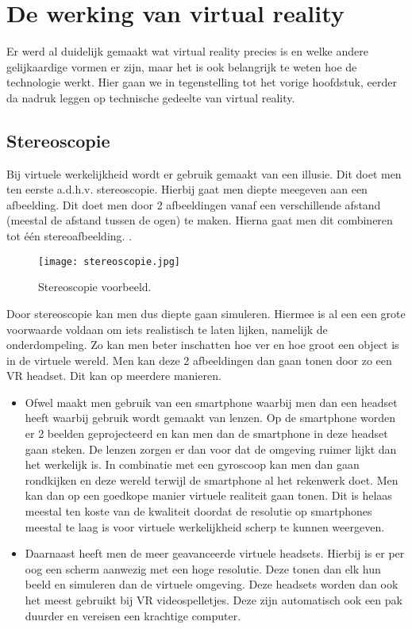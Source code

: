 \section{De werking van virtual reality}
\label{sec:hoe-werkt-vr}
Er werd al duidelijk gemaakt wat virtual reality precies is en welke andere gelijkaardige vormen er zijn, maar het is ook belangrijk te weten hoe de technologie werkt. Hier gaan we in tegenstelling tot het vorige hoofdstuk, eerder da nadruk leggen op technische gedeelte van virtual reality.

\subsection{Stereoscopie}
\label{subsec:stereoscopie}
Bij virtuele werkelijkheid wordt er gebruik gemaakt van een illusie. Dit doet men ten eerste a.d.h.v. stereoscopie. Hierbij gaat men diepte meegeven aan een afbeelding. Dit doet men door 2 afbeeldingen vanaf een verschillende afstand (meestal de afstand tussen de ogen) te maken. Hierna gaat men dit combineren tot één stereoafbeelding. \autocite{Rouse2011}.

\begin{figure}
	\centering
	\texttt{[image: stereoscopie.jpg]}
	\caption{Stereoscopie voorbeeld.}
	\label{fig:stereoscopie}
\end{figure}

Door stereoscopie kan men dus diepte gaan simuleren. Hiermee is al een een grote voorwaarde voldaan om iets realistisch te laten lijken, namelijk de onderdompeling. Zo kan men beter inschatten hoe ver en hoe groot een object is in de virtuele wereld. Men kan deze 2 afbeeldingen dan gaan tonen door zo een VR headset. Dit kan op meerdere manieren.
\begin{itemize}
	\item Ofwel maakt men gebruik van een smartphone waarbij men dan een headset heeft waarbij gebruik wordt gemaakt van lenzen. Op de smartphone worden er 2 beelden geprojecteerd en kan men dan de smartphone in deze headset gaan steken. De lenzen zorgen er dan voor dat de omgeving ruimer lijkt dan het werkelijk is. In combinatie met een gyroscoop kan men dan gaan rondkijken en deze wereld terwijl de smartphone al het rekenwerk doet. Men kan dan op een goedkope manier virtuele realiteit gaan tonen. Dit is helaas meestal ten koste van de kwaliteit doordat de resolutie op smartphones meestal te laag is voor virtuele werkelijkheid scherp te kunnen weergeven.
	
	\item Daarnaast heeft men de meer geavanceerde virtuele headsets. Hierbij is er per oog een scherm aanwezig met een hoge resolutie. Deze tonen dan elk hun beeld en simuleren dan de virtuele omgeving. Deze headsets worden dan ook het meest gebruikt bij VR videospelletjes. Deze zijn automatisch ook een pak duurder en vereisen een krachtige computer.
\end{itemize}

